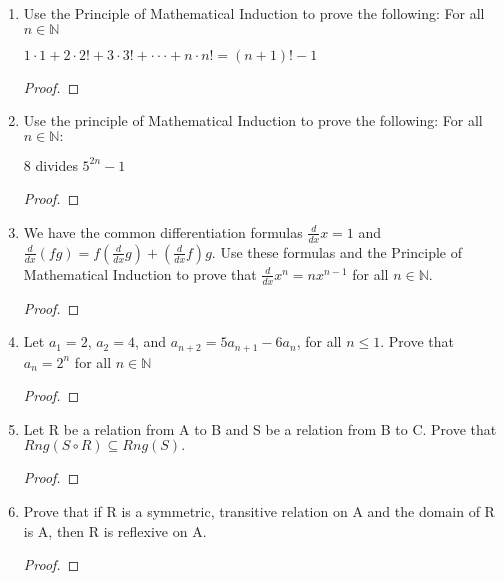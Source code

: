 \documentclass[11pt]{article}
\begin{document}
\begin{enumerate}
    \item Use the Principle of Mathematical Induction to prove the following: \newline
    For all $n \in \mathbb{N}$
    \begin{center}
        $1\cdot1+2\cdot2!+3\cdot3!+\cdot \cdot \cdot + n\cdot n!=(n+1)!-1$
    \end{center}
        \begin{proof}
        \end{proof}
        
    \item Use the principle of Mathematical Induction to prove the following: For all $n \in \mathbb{N}:$
    \begin{center}
        8 divides $5^{2n} -1$
    \end{center}
        \begin{proof}
        \end{proof}
        
    \item We have the common differentiation formulas $\frac{d}{dx} x=1$ and $\frac{d}{dx}(fg)=f(\frac{d}{dx}g) + (\frac{d}{dx}f)g$. 
    \newline Use these formulas and the Principle of Mathematical Induction to prove that $\frac{d}{dx}x^n = nx^{n-1}$ for all $n \in \mathbb{N}$.
        \begin{proof}
        \end{proof}
        
    \item Let $a_1=2$, $a_2=4$, and $a_{n+2} = 5a_{n+1} - 6a_n$, for all $n \leq 1.$ Prove that $a_n = 2^n$ for all $n \in \mathbb{N}$
        \begin{proof}
        \end{proof}
        
    \item Let R be a relation from A to B and S be a relation from B to C. \newline
    Prove that $Rng(S\circ R) \subseteq Rng(S).$
        \begin{proof}
        \end{proof}
        
    \item Prove that if R is a symmetric, transitive relation on A and the domain of R is A, then R is reflexive on A. 
        \begin{proof}
        \end{proof}
        

\end{enumerate}
\end{document}
